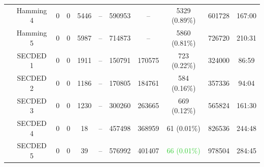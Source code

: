 \begin{frame}
\begin{table}[H]
\begin{tabular}{@{}ccccccccccc@{}}
                                                               & Hamming 4     & 0     & 0            & 5446  & --          & \num{590953}                             & --                                      & 5329 {\tiny (0.89\%)}                        & \num{601728} & 167:00                                  \\
                                                               & Hamming 5     & 0     & 0            & 5987  & --          & \num{714873}                             & --                                      & 5860 {\tiny (0.81\%)}                        & \num{726720} & 210:31                                  \\
                                                               & SECDED 1      & 0     & 0            & 1911  & --          & \num{150791}                             & \num{170575}                            & 723 {\tiny (0.22\%)}                         & \num{324000} & 86:59                                   \\
                                                               & SECDED 2      & 0     & 0            & 1186  & --          & \num{170805}                             & \num{184761}                            & 584 {\tiny (0.16\%)}                         & \num{357336} & 94:04                                   \\
                                                               & SECDED 3      & 0     & 0            & 1230  & --          & \num{300260}                             & \num{263665}                            & 669 {\tiny (0.12\%)}                         & \num{565824} & 161:30                                  \\
                                                               & SECDED 4      & 0     & 0            & 18    & --          & \num{457498}                             & \num{368959}                            & 61 {\tiny (0.01\%)}                          & \num{826536} & 244:48                                  \\
                                                               & SECDED 5      & 0     & 0            & 39    & --          & \num{576992}                             & \num{401407}                            & \textcolor{LimeGreen}{66 {\tiny (0.01\%)}}   & \num{978504} & 284:45                                  \\
            \bottomrule
        \end{tabular}
    \end{table}
\end{frame}
